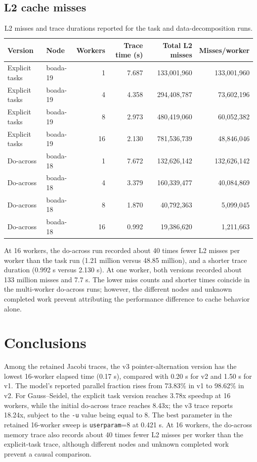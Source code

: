 \documentclass[11pt,a4paper]{article}
\begin{document}
\subsection{L2 cache misses}

\begin{table}[htbp]
  \centering
  \small
  \begin{tabular}{llrrrr}
    \toprule
    Version & Node & Workers & Trace time (s) &
    Total L2 misses & Misses/worker \\
    \midrule
    Explicit tasks & boada-19 & 1  & 7.687 & 133,001,960 & 133,001,960 \\
    Explicit tasks & boada-19 & 4  & 4.358 & 294,408,787 & 73,602,196 \\
    Explicit tasks & boada-19 & 8  & 2.973 & 480,419,060 & 60,052,382 \\
    Explicit tasks & boada-19 & 16 & 2.130 & 781,536,739 & 48,846,046 \\
    \midrule
    Do-across & boada-18 & 1  & 7.672 & 132,626,142 & 132,626,142 \\
    Do-across & boada-18 & 4  & 3.379 & 160,339,477 & 40,084,869 \\
    Do-across & boada-18 & 8  & 1.870 & 40,792,363 & 5,099,045 \\
    Do-across & boada-18 & 16 & 0.992 & 19,386,620 & 1,211,663 \\
    \bottomrule
  \end{tabular}
  \caption{L2 misses and trace durations reported for the task and
  data-decomposition runs.}
  \label{tab:memory}
\end{table}

At 16 workers, the do-across run recorded about 40 times fewer L2 misses
per worker than the task run (1.21 million versus 48.85 million), and a
shorter trace duration (0.992 s versus 2.130 s). At one worker, both
versions recorded about 133 million misses and 7.7 s. The lower miss
counts and shorter times coincide in the multi-worker do-across runs;
however, the different nodes and unknown completed work prevent
attributing the performance difference to cache behavior alone.

\FloatBarrier

\section{Conclusions}

Among the retained Jacobi traces, the v3 pointer-alternation version
has the lowest 16-worker elapsed time (0.17 s), compared with 0.20 s
for v2 and 1.50 s for v1. The model's reported parallel fraction rises
from 73.83\% in v1 to 98.62\% in v2. For Gauss--Seidel, the explicit
task version reaches 3.78x speedup at 16 workers, while the initial
do-across trace reaches 8.43x; the v3 trace reports 18.24x, subject to
the \texttt{-u} value being equal to 8.
The best parameter in the retained 16-worker sweep is
\texttt{userparam}=8 at 0.421 s. At 16 workers, the do-across memory
trace also records about 40 times fewer L2 misses per worker than the
explicit-task trace, although different nodes and unknown completed
work prevent a causal comparison. 
\end{document}
